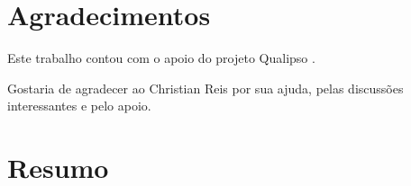 \documentclass[11pt,twoside,a4paper]{book}
\begin{document}
%
%
%
%
%	
%	  


\chapter*{Agradecimentos}

Este trabalho contou com o apoio do projeto Qualipso \cite{Qualipso}.

Gostaria de agradecer ao Christian Reis por sua ajuda, pelas
discussões interessantes e pelo apoio.

\chapter*{Resumo}
\end{document}
